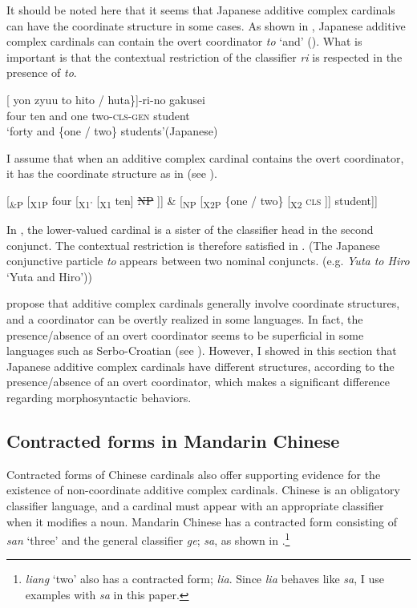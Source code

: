 \documentclass[output=paper]{langscibook}
\begin{document}
It should be noted here that it seems that Japanese additive complex cardinals can have the coordinate structure in some cases. As shown in , Japanese additive complex cardinals can contain the overt coordinator \textit{to} `and' (\citet{Hiraiwa2016ms}). What is important is that the contextual restriction of the classifier \textit{ri} is respected in the presence of \textit{to}. 

\ea\label{tat:ex:jap.additive.and}
\gll \textnormal{[} yon zyuu to \minsp{\{} hito / huta\textnormal{\}]}-ri-no gakusei\\  
      {} four ten and {} one {} two-\textsc{cls-gen} student\\ 
\glt `forty and \{one / two\} students'\hfill(Japanese)
\z

\noindent I assume that when an additive complex cardinal contains the overt coordinator, it has the coordinate structure as in  (see ).

\ea\label{tat:ex:jap.coord.st} 
{[}\textsubscript{\&P} [\textsubscript{X1P} four [\textsubscript{X1'} [\textsubscript{X1} ten] \sout{NP} ]] \& [\textsubscript{NP} [\textsubscript{X2P} \{one / two\} [\textsubscript{X2} \textsc{cls} ]] student]]
\z

\noindent In , the lower-valued cardinal is a sister of the classifier head in the second conjunct. The contextual restriction is therefore satisfied in . (The Japanese conjunctive particle \textit{to} appears between two nominal conjuncts. (e.g. \textit{Yuta to Hiro} `Yuta and Hiro'))

\citet{IoninMatushansky2018} propose that additive complex cardinals generally involve coordinate structures, and a coordinator can be overtly realized in some languages. In fact, the presence/absence of an overt coordinator seems to be superficial in some languages such as Serbo-Croatian (see ). However, I showed in this section that Japanese additive complex cardinals have different structures, according to the presence/absence of an overt coordinator, which makes a significant difference regarding morphosyntactic behaviors.

\subsection{Contracted forms in Mandarin Chinese}\label{tat:sec:add.ma}
Contracted forms of Chinese cardinals also offer supporting evidence for the existence of non-coordinate additive complex cardinals. Chinese is an obligatory classifier language, and a cardinal must appear with an appropriate classifier when it modifies a noun. Mandarin Chinese has a contracted form consisting of \textit{san} `three' and the general classifier \textit{ge}; \textit{sa}, as shown in .\footnote{\textit{liang} `two' also has a contracted form; \textit{lia}. Since \textit{lia} behaves like \textit{sa}, I use examples with \textit{sa} in this paper.} 
\end{document}
